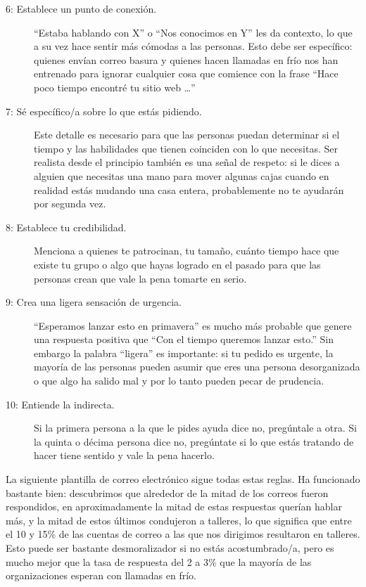 \begin{description}
\item[6: Establece un punto de conexión.]
``Estaba hablando con X'' o ``Nos conocimos en Y'' les da contexto,
lo que a su vez hace sentir más cómodas a las personas.
Esto debe ser específico:
quienes envían correo basura y quienes hacen llamadas en frío
nos han entrenado para ignorar cualquier cosa que comience con la frase
``Hace poco tiempo encontré tu sitio web {\ldots}''

\item[7: Sé específico/a sobre lo que estás pidiendo.]
Este detalle es necesario para que las personas
puedan determinar si el tiempo y las habilidades que tienen
coinciden con lo que necesitas.
Ser realista desde el principio también es una señal de respeto:
 si le dices a alguien que necesitas una mano para mover algunas cajas 
 cuando en realidad estás mudando una casa entera,
 probablemente no te ayudarán por segunda vez.

\item[8: Establece tu credibilidad.]
Menciona a quienes te patrocinan,
tu tamaño,
cuánto tiempo hace que existe tu grupo o algo que hayas logrado en el pasado
para que las personas crean que vale la pena tomarte en serio.

\item[9: Crea una ligera sensación de urgencia.]
``Esperamos lanzar esto en primavera'' es mucho más probable que genere una respuesta positiva 
que ``Con el tiempo queremos lanzar esto.''
Sin embargo la palabra ``ligera'' es importante:
si tu pedido es urgente, 
la mayoría de las personas pueden asumir que eres una persona desorganizada 
o que algo ha salido mal
y por lo tanto pueden pecar de prudencia.

\item[10: Entiende la indirecta.]
Si la primera persona a la que le pides ayuda dice no,
pregúntale a otra.
Si la quinta o décima persona dice no,
pregúntate si lo que estás tratando de hacer tiene sentido y vale la pena hacerlo.
\end{description}

La siguiente plantilla de correo electrónico sigue todas estas reglas.
Ha funcionado bastante bien:
descubrimos que alrededor de la mitad de los correos fueron respondidos, en
aproximadamente  la mitad de estas respuestas querían hablar más,
y la mitad de estos últimos condujeron a talleres,
lo que significa que entre el 10 y 15\% de las cuentas de correo a las que nos dirigimos resultaron en talleres.
Esto puede ser bastante desmoralizador si no estás acostumbrado/a, 
pero es mucho mejor que la tasa de respuesta del 2 a 3\% que la mayoría de las organizaciones esperan con llamadas en frío.

